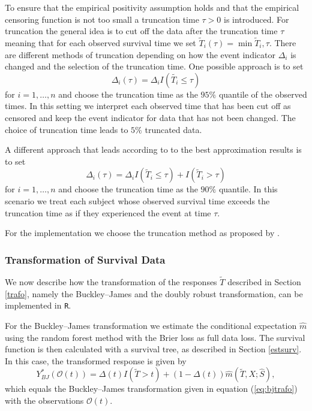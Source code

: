 \documentclass[12pt, a4paper]{scrartcl}
\theoremstyle{definition}
\theoremstyle{plain}
\numberwithin{equation}{section}
\numberwithin{figure}{section}
\numberwithin{table}{section}
\begin{document}
	To ensure that the empirical positivity assumption holds and that the empirical censoring function is not too small a truncation time $\tau>0$ is introduced.
	For truncation the general idea is to cut off the data after the truncation time $\tau$ meaning that for each observed survival time we set $\tilde{T}_i(\tau)=\min{\tilde{T}_i, \tau}$.
	There are different methods of truncation depending on how the event indicator $\Delta_i$ is changed and the selection of the truncation time.
	One possible approach is to set $$\Delta_i(\tau) = \Delta_i I(\tilde{T_i} \leq \tau)$$  for $i=1,\dots,n$ and choose the truncation time as the $95\%$ quantile of the observed times.
	In this setting we interpret each observed time that has been cut off as censored and keep the event indicator for data that has not been changed.
	The choice of truncation time leads to $5\%$ truncated data.
	
	A different approach that leads according to \citet*{drtrees} to the best approximation results is to set $$\Delta_i(\tau) = \Delta_i I(\tilde{T}_i\leq \tau) + I(\tilde{T}_i > \tau)$$ for $i=1,\dots,n$ and choose the truncation time as the $90\%$ quantile.
	In this scenario we treat each subject whose observed survival time exceeds the truncation time as if they experienced the event at time $\tau$.
	
	For the implementation we choose the truncation method as proposed by \citet*{drtrees}.
	\subsubsection{Transformation of Survival Data}
	
	We now describe how the transformation of the responses $\tilde T$ described in Section \ref{trafo}, namely the Buckley--James and the doubly robust transformation, can be implemented in \texttt{R}.
	
	For the Buckley--James transformation we estimate the conditional expectation $\hat{m}$ using the random forest method with the Brier loss as full data loss.
	The survival function is then calculated with a survival tree, as described in Section \ref{estsurv}.
	In this case, the transformed response is given by
	\begin{equation*}
	Y^*_{BJ}(\mathcal{O}(t)) = \Delta(t)I(\tilde T>t)+ (1-\Delta(t))\hat{m}(\tilde T, X; \hat{S}),
	\end{equation*}
	which equals the Buckley--James transformation given in equation (\ref{eq:bjtrafo}) with the observations $\mathcal{O}(t)$.
	
\end{document}
